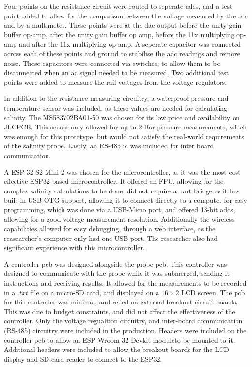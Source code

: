 Four points on the resistance circuit were routed to seperate \gls{adc}s, and a test point added to allow for the comparison between the voltage measured by the \gls{adc} and by a multimeter.
These points were at the \gls{dac} output before the unity gain buffer op-amp, after the unity gain buffer op amp, before the 11x multiplying op-amp and after the 11x multiplying op-amp.
A seperate capacitor was connected across each of these points and ground to stabilise the \gls{adc} readings and remove noise.
These capacitors were connected via switches, to allow them to be disconnected when an \gls{ac} signal needed to be measured.
Two additional test points were added to measure the rail voltages from the voltage regulators.

In addition to the resistance measuring circuitry, a waterproof pressure and temperature sensor was included, as these values are needed for calculating salinity.
The MS583702BA01-50 was chosen for its low price and availability on JLCPCB.
This sensor only allowed for up to 2 Bar pressure measurements, which was enough for this prototype, but would not satisfy the real-world requirements of the salinity probe.
Lastly, an RS-485 \gls{ic} was included for inter board communication.

A ESP-32 S2-Mini-2 was chosen for the microcontroller, as it was the most cost effective ESP32 based microcontroller.
It offered an FPU, allowing for the complex salinity calculations to be done, did not require a \gls{uart} bridge as it has built-in USB OTG support, allowing it to connect directly to a computer for easy programming, which was done via a USB-Micro port, and offered 13-bit \gls{adc}s, allowing for a good voltage measurement resolution.
Additionally the wireless capabilities allowed for easy debugging, through a web interface, as the reasearcher's computer only had one USB port.
The researcher also had significant experience with this microcontroller.

A controller \gls{pcb} was designed alongside the probe \gls{pcb}.
This controller was designed to communicate with the probe while it was submerged, sending it instructions and receiving results.
It allowed for the measurements to be recorded in a $.txt$ file on a micro-SD card, and displayed on a $16\times2$ LCD screen.
The \gls{pcb} for this controller was minimal, and relied on external breakout circuit boards.
This was due to budget constraints, and did not affect the effectiveness of the controller.
Only the voltage regualtion circuitry, and inter-board communication (RS-485) circuitry were included in the production.
Headers were included on the controller \gls{pcb} to allow an ESP-Wroom-32 Devkit moduleto be mounted to it.
Additional headers were included to allow the breakout boards for the LCD display and SD card reader to connect to the ESP32. 

